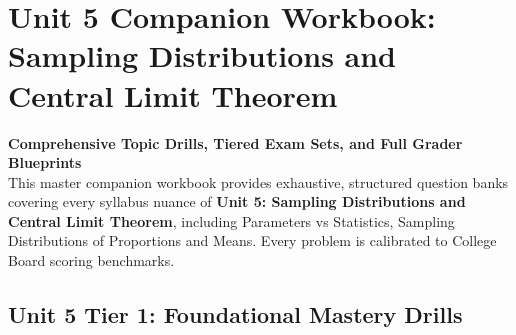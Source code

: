 \chapter{Unit 5 Companion Workbook: Sampling Distributions and Central Limit Theorem}
\label{chap:companion_unit_5}
{\large\bfseries\color{MidnightBlue} Comprehensive Topic Drills, Tiered Exam Sets, and Full Grader Blueprints}\\[8pt]
This master companion workbook provides exhaustive, structured question banks covering every syllabus nuance of \textbf{Unit 5: Sampling Distributions and Central Limit Theorem}, including Parameters vs Statistics, Sampling Distributions of Proportions and Means. Every problem is calibrated to College Board scoring benchmarks.\\[12pt]
\section{Unit 5 Tier 1: Foundational Mastery Drills}
